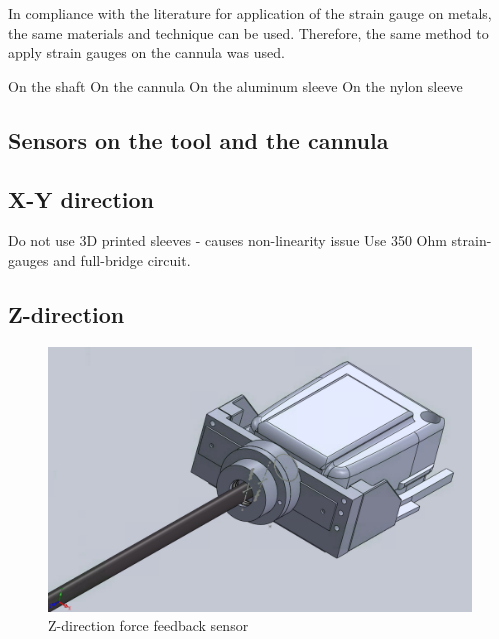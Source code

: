 	In compliance with the literature \cite{StrGugeInst} for application of the strain gauge on metals, the same materials and technique can be used. Therefore, the same method to apply strain gauges on the cannula was used.

	On the shaft
	On the cannula
	On the aluminum sleeve
	On the nylon sleeve

\subsection{Sensors on the tool and the cannula}
\label{sec:senOnToolCan}


\subsection{X-Y direction}
\label{sec:xyDir}
Do not use 3D printed sleeves - causes non-linearity issue
Use 350 Ohm strain-gauges and full-bridge circuit.
	
\subsection{Z-direction}
\label{sec:zDir}
\begin{figure}
	\begin{center}
		\includegraphics[width=120mm]{fig/methods/z_dir.png}
	\end{center}
	\vspace{-4mm}
	\caption[Z-direction force feedback sensor]
	{Z-direction force feedback sensor}
	\label{fig:Z-direction}
	\vspace{-2mm}
\end{figure}

